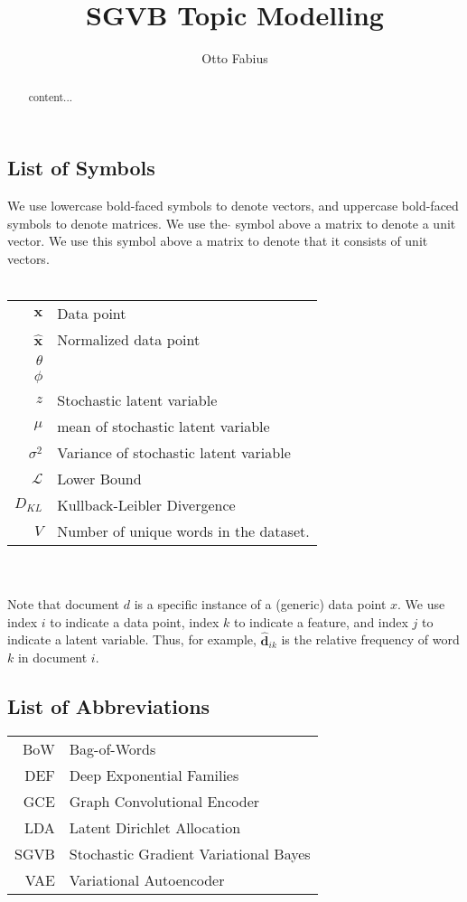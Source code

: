 \documentclass{report}
\author{Otto Fabius}
\title{SGVB Topic Modelling}
\begin{document}
\large
\doublespacing
\maketitle
\begin{abstract}
	content...
\end{abstract}
\chapter*{}
\onehalfspacing
\section*{List of Symbols}
We use lowercase bold-faced symbols to denote vectors, and uppercase bold-faced symbols to denote matrices. We use the $\hat{}$ symbol above a matrix to denote a unit vector. We use this symbol above a matrix to denote that it consists of unit vectors. \\ \\
\begin{tabular}{r l}
	\hspace{15mm} $\mathbf{x}$ & Data point \\
	$\mathbf{\hat{x}}$ & Normalized data point \\
	$\theta$ & \\
	$\phi$ & \\
	$z$ & Stochastic latent variable\\
	$\mu$ & mean of stochastic latent variable\\
	$\sigma ^2 $ & Variance of stochastic latent variable \\
	$\mathcal{L}$ & Lower Bound \\
	$D_{KL}$ & Kullback-Leibler Divergence \\
	$V$ & Number of unique words in the dataset.
\end{tabular}
\\ \\
Note that document $d$ is a specific instance of a (generic) data point $x$. We use index $i$ to indicate a data point, index $k$ to indicate a feature, and index $j$ to indicate a latent variable.  Thus, for example, $\mathbf{\hat{d}}_{ik}$ is the relative frequency of word $k$ in document $i$.
\section*{List of Abbreviations}
\begin{tabular}{r l}
	\hspace{10mm} BoW & Bag-of-Words \\
	DEF & Deep Exponential Families \\
	GCE & Graph Convolutional Encoder \\
	LDA & Latent Dirichlet Allocation \\
	SGVB & Stochastic Gradient Variational Bayes \\
	VAE & Variational Autoencoder \\
\end{tabular}
\end{document}
